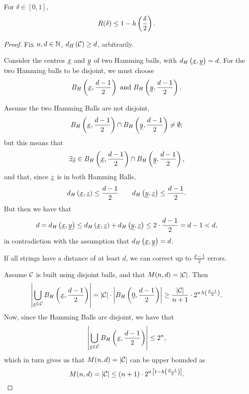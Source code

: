 \begin{thm} \label{thm:hamming-bound}
	For $\delta \in [0, 1]$,
	\begin{equation*}
		R(\delta) \le 1 - h\left({\frac{\delta}{2}}\right).
	\end{equation*}
\end{thm}

\begin{proof}
	Fix $n, d \in \mathbb{N}$, $d_H \left({\mathcal{C}}\right) \ge d$, arbitrarily.

	Consider the centres $\underline{x}$ and $\underline{y}$ of two Hamming balls, with $d_H \left({\underline{x}, \underline{y}}\right) = d$.
	For the two Hamming balls to be disjoint, we must choose
	\begin{equation*}
		B_H\left(\underline{x}, \frac{d-1}{2}\right)
		\text{ and }
		B_H\left(\underline{y}, \frac{d-1}{2}\right).
	\end{equation*}

	Assume the two Hamming Balls are not disjoint, \ie
	\begin{equation*}
		B_H\left(\underline{x}, \frac{d-1}{2}\right)
		\cap
		B_H\left(\underline{y}, \frac{d-1}{2}\right)
		\neq \emptyset;
	\end{equation*}
	but this means that
	\begin{equation*}
		\exists \underline{z} \in
		B_H\left(\underline{x}, \frac{d-1}{2}\right)
		\cap
		B_H\left(\underline{y}, \frac{d-1}{2}\right),
	\end{equation*}
	and that, since $\underline{z}$ is in both Hamming Balls,
	\begin{equation*}
		d_H \left({\underline{x},\underline{z}}\right) \le \frac{d-1}{2}
		\qquad
		d_H \left({\underline{y},\underline{z}}\right) \le \frac{d-1}{2}.
	\end{equation*}
	But then we have that
	\begin{equation*}
		d = d_H \left({\underline{x},\underline{y}}\right)
		\le
		d_H \left({\underline{x},\underline{z}}\right) + d_H \left({\underline{y},\underline{z}}\right)
		\le
		2 \cdot \frac{d-1}{2}
		= d-1 < d,
	\end{equation*}
	in contradiction with the assumption that $d_H \left({\underline{x},\underline{y}}\right) = d$.

	If all strings have a distance of at least $d$, we can correct up to $\frac{d-1}{2}$ errors.

	Assume $\mathcal{C}$ is built using disjoint balls, and that $M(n, d) = \left|{\mathcal{C}}\right|$.
	Then
	\begin{equation*}
		\left|{\bigcup_{\underline{x} \in \mathcal{C}} B_H\left(\underline{x}, \frac{d-1}{2}\right)}\right|
		=
		\left|{\mathcal{C}}\right| \cdot \left|{B_H\left(\underline{0}, \frac{d-1}{2}\right)}\right|
		\ge
		\frac{\left|{\mathcal{C}}\right|}{n+1} \cdot 2^{n \, h\left({\frac{d-1}{2}}\right)}.
	\end{equation*}
	Now, since the Hamming Balls are disjoint, we have that
	\begin{equation*}
		\left|{\bigcup_{\underline{x} \in \mathcal{C}} B_H\left(\underline{x}, \frac{d-1}{2}\right)}\right| \le 2^n,
	\end{equation*}
	which in turn gives us that $M(n,d) = \left|{\mathcal{C}}\right|$ can be upper bounded as
	\begin{equation*}
		M(n, d) = \left|{\mathcal{C}}\right| \le (n+1) \cdot 2^{n \, \left[1 - h\left({\frac{d-1}{2}}\right)\right]}.
	\end{equation*}
	

\end{proof}
